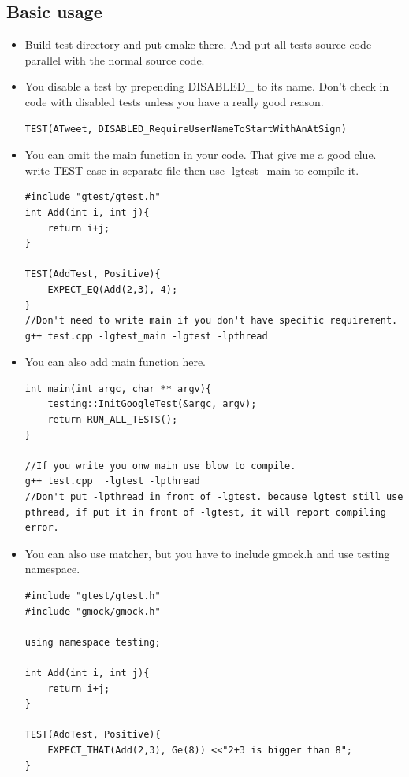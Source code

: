 \documentclass[a4paper,11pt,twoside]{book}
\begin{document}
\subsection{Basic usage}
\begin{itemize}
	\item Build test directory and put cmake there. And put all tests source code parallel with the normal source code.
	
	\item  You disable a test by prepending DISABLED\_ to its name.  Don't check in code with disabled tests unless you have a really good reason.
\begin{lstlisting}
TEST(ATweet, DISABLED_RequireUserNameToStartWithAnAtSign)
\end{lstlisting}

	\item You can omit the main function in your code. That give me a good clue. write TEST case in separate file then use -lgtest\_main to compile it. 
	
\begin{lstlisting}
#include "gtest/gtest.h"
int Add(int i, int j){
	return i+j;
}

TEST(AddTest, Positive){
	EXPECT_EQ(Add(2,3), 4);
}
//Don't need to write main if you don't have specific requirement.
g++ test.cpp -lgtest_main -lgtest -lpthread
\end{lstlisting}

\item You can also add main function here.
\begin{lstlisting}
int main(int argc, char ** argv){
	testing::InitGoogleTest(&argc, argv);
	return RUN_ALL_TESTS();
}

//If you write you onw main use blow to compile. 
g++ test.cpp  -lgtest -lpthread
//Don't put -lpthread in front of -lgtest. because lgtest still use pthread, if put it in front of -lgtest, it will report compiling error.
\end{lstlisting}

\item You can also use matcher, but you have to include gmock.h and use testing namespace.
\begin{lstlisting}
#include "gtest/gtest.h"
#include "gmock/gmock.h"

using namespace testing;

int Add(int i, int j){
	return i+j;
}

TEST(AddTest, Positive){
	EXPECT_THAT(Add(2,3), Ge(8)) <<"2+3 is bigger than 8";
}


\end{lstlisting}
\end{itemize}
\end{document}
